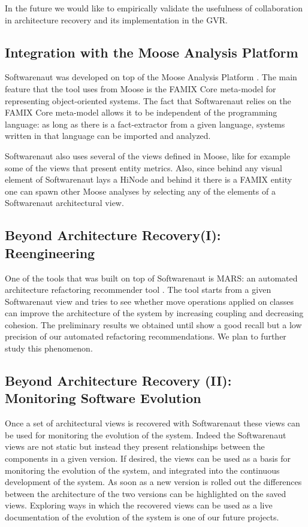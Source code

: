 \documentclass[preprint,12pt]{elsarticle}
\begin{document}
In the future we would like to empirically validate the usefulness of collaboration in architecture recovery and its implementation in the GVR.


\subsection {Integration with the Moose Analysis Platform}
Softwarenaut was developed on top of the Moose Analysis Platform \cite{nier-story}. The main feature that the tool uses from Moose is the FAMIX Core meta-model for representing object-oriented systems. The fact that Softwarenaut relies on the FAMIX Core meta-model allows it to be independent of the programming language: as long as there is a fact-extractor from a given language, systems written in that language can be imported and analyzed. 

Softwarenaut also uses several of the views defined in Moose, like for example some of the views that present entity metrics. Also, since behind any visual element of Softwarenaut lays a HiNode and behind it there is a FAMIX entity one can spawn other Moose analyses by selecting any of the elements of a Softwarenaut architectural view. 



\subsection {Beyond Architecture Recovery(I): Reengineering}
One of the tools that was built on top of Softwarenaut is MARS: an automated architecture refactoring recommender tool \cite{}. The tool starts from a given Softwarenaut view and tries to see whether move operations applied on classes can improve the architecture of the system by increasing coupling and decreasing cohesion. The preliminary results we obtained until show a good recall but a low precision of our automated refactoring recommendations. We plan to further study this phenomenon.

\subsection {Beyond Architecture Recovery (II): Monitoring Software Evolution}
Once a set of architectural views is recovered with Softwarenaut these views can be used for monitoring the evolution of the system. Indeed the Softwarenaut views are not static but instead they present relationships between the components in a given version. If desired, the views can be used as a basis for monitoring the evolution of the system, and integrated into the continuous development of the system. As soon as a new version is rolled out the differences between the architecture of the two versions can be highlighted on the saved views. Exploring ways in which the recovered views can be used as a live documentation of the evolution of the system is one of our future projects.
\end{document}

